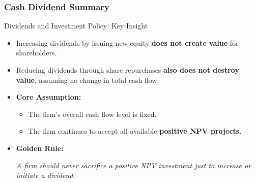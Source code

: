 \subsubsection*{Cash Dividend Summary}
\begin{frame}{Dividends and Investment Policy: Key Insight}

\begin{itemize}
    \item Increasing dividends by issuing new equity \textbf{does not create value} for shareholders.
    
    \item Reducing dividends through share repurchases \textbf{also does not destroy value}, assuming no change in total cash flow.

    \vspace{3mm}
    \item \textbf{Core Assumption:}
    \begin{itemize}
        \item The firm's overall cash flow level is fixed.
        \item The firm continues to accept all available \textbf{positive NPV projects}.
    \end{itemize}

    \vspace{3mm}
    \item \textbf{Golden Rule:}
    \begin{block}{}
        \centering
        \textit{A firm should never sacrifice a positive NPV investment just to increase or initiate a dividend.}
    \end{block}
\end{itemize}

\end{frame}

